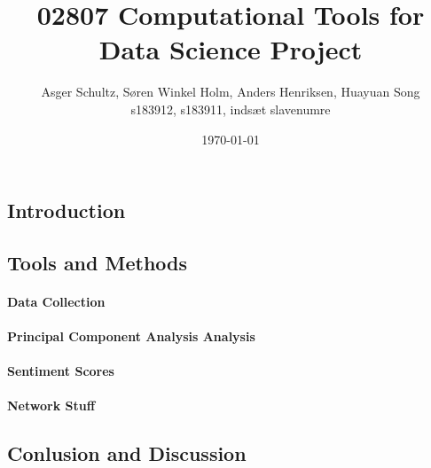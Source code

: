 \documentclass[12pt,fleqn]{article}
\title{\vspace*{-3cm}02807 Computational Tools for Data Science Project}
\author{Asger Schultz, Søren Winkel Holm, Anders Henriksen, Huayuan Song\\
s183912, s183911, indsæt slavenumre}
\date{\today}
\begin{document}
\maketitle

\subsection*{Introduction}

\subsection*{Tools and Methods}

\paragraph{Data Collection}

\paragraph{Principal Component Analysis Analysis}

\paragraph{Sentiment Scores}

\paragraph{Network Stuff}

\subsection*{Conlusion and Discussion}
\end{document}
